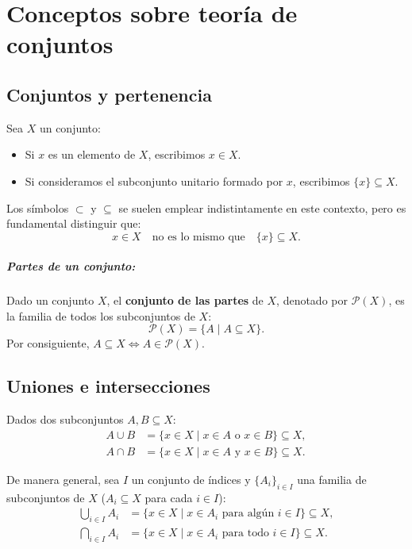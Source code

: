 \setcounter{chapter}{-1} \justifying
\chapter{Conceptos sobre teor\'ia de conjuntos}
\section{Conjuntos y pertenencia}

Sea $X$ un conjunto:
\begin{itemize}
    \item Si $x$ es un elemento de $X$, escribimos $x \in X$.
    \item Si consideramos el subconjunto unitario formado por $x$, escribimos $\{x\} \subseteq X$.
\end{itemize}

\begin{obs}
Los símbolos $\subset$ y $\subseteq$ se suelen emplear indistintamente en este contexto, pero es fundamental distinguir que:
$$
    x \in X \quad\text{no es lo mismo que}\quad \{x\} \subseteq X \text{}.
$$
\end{obs}

\paragraph{Partes de un conjunto:}
Dado un conjunto $X$, el \textbf{conjunto de las partes} de $X$, denotado por $\mathcal{P}(X)$, es la familia de todos los subconjuntos de $X$:
$$
    \mathcal{P}(X) = \{A \mid A \subseteq X\} \text{}.
$$
Por consiguiente, $A \subseteq X \iff A \in \mathcal{P}(X)$.

\section{Uniones e intersecciones}

Dados dos subconjuntos $A, B \subseteq X$:
\begin{align*}
    A \cup B &= \{x \in X \mid x \in A \text{ o } x \in B\} \subseteq X \text{}, \\
    A \cap B &= \{x \in X \mid x \in A \text{ y } x \in B\} \subseteq X \text{}.
\end{align*}

De manera general, sea $I$ un conjunto de índices y $\{A_i\}_{i \in I}$ una familia de subconjuntos de $X$ ($A_i \subseteq X$ para cada $i \in I$):
\begin{align*}
    \bigcup_{i \in I} A_i &= \{x \in X \mid x \in A_i \text{ para algún } i \in I\} \subseteq X \text{}, \\
    \bigcap_{i \in I} A_i &= \{x \in X \mid x \in A_i \text{ para todo } i \in I\} \subseteq X \text{}.
\end{align*}

